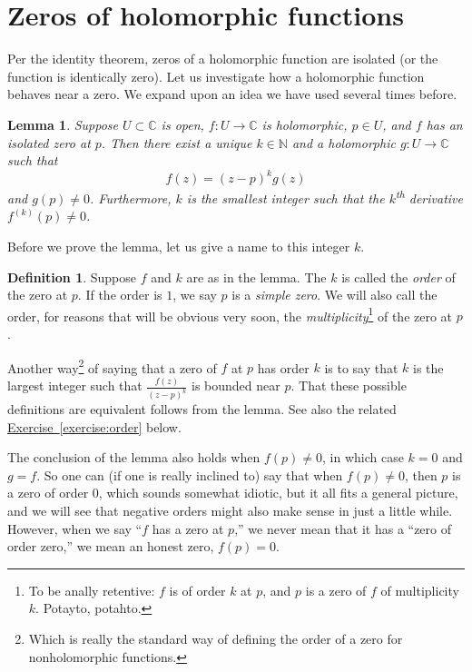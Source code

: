 \documentclass[12pt,openany]{book}
\newcommand{\C}{{\mathbb{C}}}
\newcommand{\N}{{\mathbb{N}}}
\newcommand{\myindex}[1]{#1\index{#1}}
\newcommand{\myquote}[1]{``#1''}
\theoremstyle{plain}
\newtheorem{lemma}[thm]{Lemma}
\theoremstyle{remark}
\theoremstyle{definition}
\newtheorem{defn}[thm]{Definition}
\theoremstyle{exercise}
\theoremstyle{example}
\newcommand{\exerciseref}[1]{\hyperref[#1]{Exercise~\ref*{#1}}}
\begin{document}

\section{Zeros of holomorphic functions}

Per the identity theorem, zeros of a holomorphic function are
isolated (or the function is identically zero).  Let us investigate how a
holomorphic function behaves near a zero.
We expand upon an idea we have used several times before.

\begin{lemma}
Suppose $U \subset \C$ is open, $f \colon U \to \C$ is holomorphic, $p \in U$,
and $f$ has an isolated zero at $p$.
Then there exist a unique $k \in \N$ and a holomorphic $g \colon U
\to \C$ such that
\begin{equation*}
f(z) = {(z-p)}^k g(z)
\end{equation*}
and $g(p) \neq 0$.
Furthermore, $k$ is the smallest integer such that the $k$\textsuperscript{th}
derivative $f^{(k)}(p) \neq 0$.
\end{lemma}

Before we prove the lemma, let us give a name to this integer $k$.

\begin{defn}
Suppose $f$ and $k$ are as in the lemma.
The $k$ is called the \emph{order}
of the zero at $p$.
If the order is $1$, we say $p$ is a \emph{\myindex{simple zero}}.
We will also call the order, for reasons that will be obvious very soon,
the \emph{multiplicity}\footnote{%
To be anally retentive: $f$ is of order $k$ at $p$,
and $p$ is a zero of $f$ of multiplicity $k$.  Potayto, potahto.}
of the zero at $p$.
\end{defn}

Another way\footnote{Which is really the standard way of defining the order of a
zero for nonholomorphic functions.}
of saying that a zero of $f$ at $p$ has order $k$ is to say that
$k$ is the largest integer such that $\frac{f(z)}{{(z-p)}^{k}}$ is bounded
near $p$.  That these possible definitions are equivalent
follows from the lemma.  See also the related \exerciseref{exercise:order} below.

The conclusion of the lemma also holds when $f(p) \neq 0$,
in which case
$k=0$ and $g = f$.  So one can (if one is really inclined to)
say that when $f(p) \neq 0$, then $p$ is
a zero of order $0$, which sounds somewhat idiotic, but it all fits a general
picture, and we will see that negative orders might also make sense
in just a little while.
However, when we say \myquote{$f$ has a zero at $p$,}
we never mean that it has a
\myquote{zero of order zero,} we mean an honest zero, $f(p) = 0$.
\end{document}
